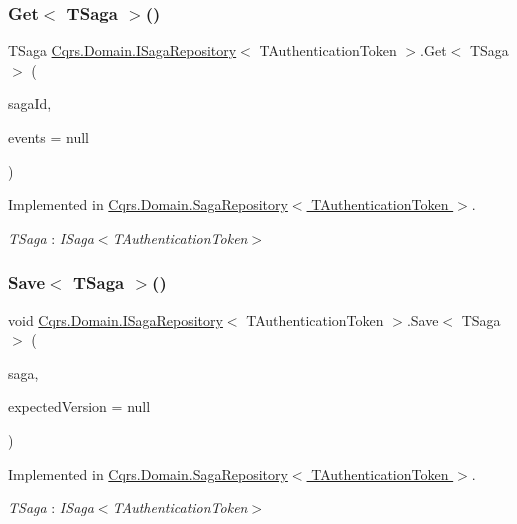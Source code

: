 \subsubsection{\texorpdfstring{Get$<$ T\+Saga $>$()}{Get< TSaga >()}}
{\footnotesize\ttfamily T\+Saga \hyperlink{interfaceCqrs_1_1Domain_1_1ISagaRepository}{Cqrs.\+Domain.\+I\+Saga\+Repository}$<$ T\+Authentication\+Token $>$.Get$<$ T\+Saga $>$ (\begin{DoxyParamCaption}\item[{Guid}]{saga\+Id,  }\item[{I\+List$<$ \hyperlink{interfaceCqrs_1_1Events_1_1ISagaEvent}{I\+Saga\+Event}$<$ T\+Authentication\+Token $>$$>$}]{events = {\ttfamily null} }\end{DoxyParamCaption})}



Implemented in \hyperlink{classCqrs_1_1Domain_1_1SagaRepository_a1b80ecc2a5719d1681ca5d182a252120}{Cqrs.\+Domain.\+Saga\+Repository$<$ T\+Authentication\+Token $>$}.

\begin{Desc}
\item[Type Constraints]\begin{description}
\item[{\em T\+Saga} : {\em I\+Saga$<$T\+Authentication\+Token$>$}]\end{description}
\end{Desc}
\mbox{\label{interfaceCqrs_1_1Domain_1_1ISagaRepository_ad539cdc70f3168d0335c9510742e25cd}} 
\subsubsection{\texorpdfstring{Save$<$ T\+Saga $>$()}{Save< TSaga >()}}
{\footnotesize\ttfamily void \hyperlink{interfaceCqrs_1_1Domain_1_1ISagaRepository}{Cqrs.\+Domain.\+I\+Saga\+Repository}$<$ T\+Authentication\+Token $>$.Save$<$ T\+Saga $>$ (\begin{DoxyParamCaption}\item[{T\+Saga}]{saga,  }\item[{int?}]{expected\+Version = {\ttfamily null} }\end{DoxyParamCaption})}



Implemented in \hyperlink{classCqrs_1_1Domain_1_1SagaRepository_a84cae424cb01de22864ae7d960007cd0}{Cqrs.\+Domain.\+Saga\+Repository$<$ T\+Authentication\+Token $>$}.

\begin{Desc}
\item[Type Constraints]\begin{description}
\item[{\em T\+Saga} : {\em I\+Saga$<$T\+Authentication\+Token$>$}]\end{description}
\end{Desc}
